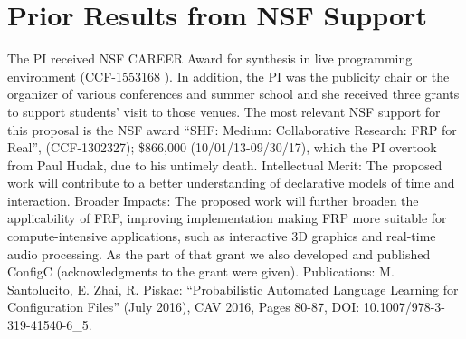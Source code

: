 \section{Prior Results from NSF Support}

The PI received NSF CAREER Award for synthesis in live programming environment
(CCF-1553168 ). In addition, the PI was the publicity chair or the organizer of various
conferences and summer school and she received three grants to support students' visit 
to those venues. The most relevant NSF support for this proposal is the
NSF award ``SHF: Medium: Collaborative Research: FRP for Real'',
(CCF-1302327); \$866,000 (10/01/13-09/30/17), which the PI overtook  from 
Paul Hudak, due to his untimely death. Intellectual Merit: The
proposed work will contribute to a better understanding of declarative models
of time and interaction. Broader Impacts: The proposed work will further broaden
the applicability of FRP, improving implementation making FRP more suitable for
compute-intensive applications, such as interactive 3D graphics and real-time audio
processing. As the part of that grant we also developed and published ConfigC
(acknowledgments to the grant were given). Publications: M. Santolucito, 
E. Zhai, R. Piskac: ``Probabilistic Automated Language Learning for Configuration Files''
(July 2016), CAV 2016, Pages 80-87, DOI: 10.1007/978-3-319-41540-6\_5.


